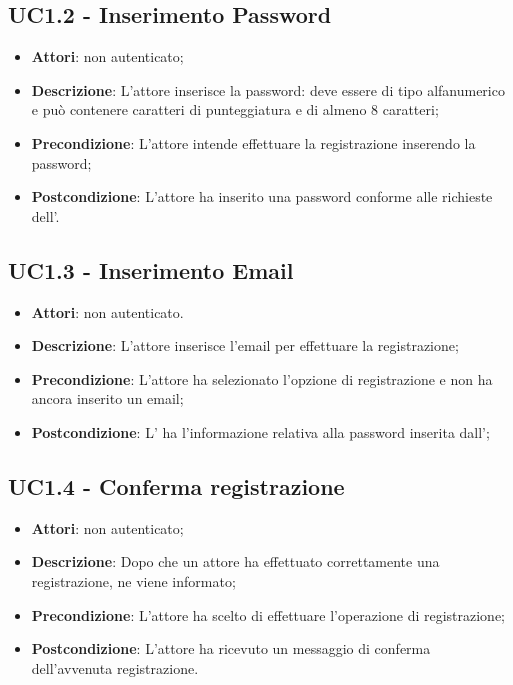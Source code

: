 \subsection{UC1.2 - Inserimento Password}
\label{ssec:UC1.2}
\begin{itemize}
\item \textbf{Attori}:  non autenticato;
\item \textbf{Descrizione}: L’attore inserisce la password: deve essere di tipo alfanumerico e può contenere caratteri di punteggiatura e di almeno 8 caratteri;
\item \textbf{Precondizione}: L'attore intende effettuare la registrazione inserendo la password;
\item \textbf{Postcondizione}: L'attore ha inserito una password conforme alle richieste dell'.
\end{itemize}
\subsection{UC1.3 - Inserimento Email}
\label{ssec:UC1.3}
\begin{itemize}
\item \textbf{Attori}:  non autenticato.
\item \textbf{Descrizione}: L’attore inserisce l'email per effettuare la registrazione;
\item \textbf{Precondizione}: L'attore ha selezionato l'opzione di registrazione e non ha ancora inserito un email;
\item \textbf{Postcondizione}: L' ha l’informazione relativa alla password inserita dall’;
\end{itemize}
\newpage
\subsection{UC1.4 - Conferma registrazione}
\label{ssec:UC1.4}
\begin{itemize}
\item \textbf{Attori}:  non autenticato;
\item \textbf{Descrizione}: Dopo che un attore ha effettuato correttamente una registrazione, ne viene informato;
\item \textbf{Precondizione}: L'attore ha scelto di effettuare l'operazione di registrazione;
\item \textbf{Postcondizione}: L'attore ha ricevuto un messaggio di conferma dell'avvenuta registrazione.
\end{itemize}
